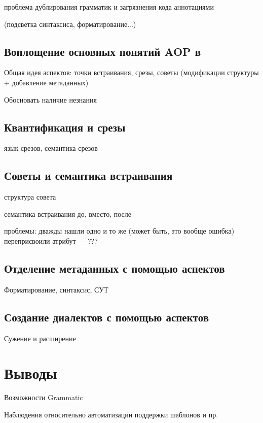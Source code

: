 проблема дублирования грамматик и загрязнения кода аннотациями

(подсветка синтаксиса, форматирование...)

\section{Воплощение основных понятий AOP в }

Общая идея аспектов: точки встраивания, срезы, советы (модификации структуры + добавление метаданных)

Обосновать наличие незнания

\section{Квантификация и срезы}

язык срезов, семантика срезов

\section{Советы и семантика встраивания}

структура совета

семантика встраивания до, вместо, после

проблемы: 
	дважды нашли одно и то же (может быть, это вообще ошибка)
	переприсвоили атрибут --- ???
	
\section{Отделение метаданных с помощью аспектов}

Форматирование, синтаксис, СУТ

\section{Создание диалектов с помощью аспектов}

Сужение и расширение

\chapter{Выводы}

Возможности Grammatic

Наблюдения относительно автоматизации поддержки шаблонов и пр.




